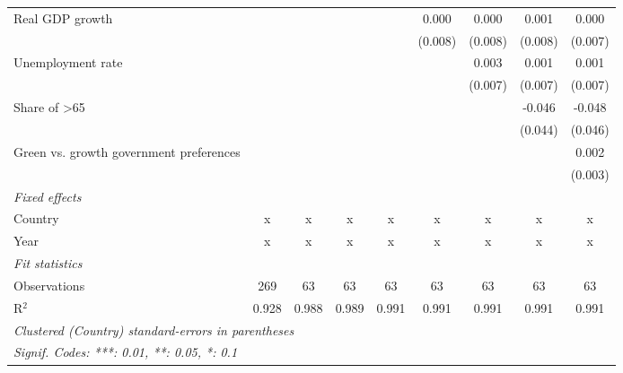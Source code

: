 \begin{table}[htbp]
\begin{tabular}{lcccccccc}
      Real GDP growth                                                    &              &         &         &              & 0.000        & 0.000        & 0.001        & 0.000\\   
                                                                         &              &         &         &              & (0.008)      & (0.008)      & (0.008)      & (0.007)\\   
      Unemployment rate                                                  &              &         &         &              &              & 0.003        & 0.001        & 0.001\\   
                                                                         &              &         &         &              &              & (0.007)      & (0.007)      & (0.007)\\   
      Share of >65                                                       &              &         &         &              &              &              & -0.046       & -0.048\\   
                                                                         &              &         &         &              &              &              & (0.044)      & (0.046)\\   
      Green vs. growth government preferences                            &              &         &         &              &              &              &              & 0.002\\   
                                                                         &              &         &         &              &              &              &              & (0.003)\\   
      \emph{Fixed effects}\\
      Country                                                            & x            & x       & x       & x            & x            & x            & x            & x\\  
      Year                                                               & x            & x       & x       & x            & x            & x            & x            & x\\  
      \midrule \emph{Fit statistics}\\
      Observations                                                       & 269          & 63      & 63      & 63           & 63           & 63           & 63           & 63\\  
      R$^2$                                                              & 0.928        & 0.988   & 0.989   & 0.991        & 0.991        & 0.991        & 0.991        & 0.991\\  
      \midrule
      \multicolumn{9}{l}{\emph{Clustered (Country) standard-errors in parentheses}}\\
      \multicolumn{9}{l}{\emph{Signif. Codes: ***: 0.01, **: 0.05, *: 0.1}}\\
   \end{tabular}
\end{table}


